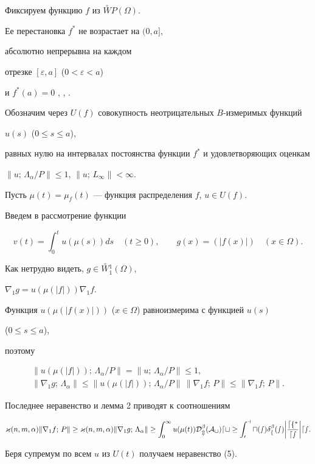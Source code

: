 \begin{pf} Фиксируем функцию $f$ из $\overset{\circ}{W}P(\Omega)$. 


Ее перестановка $f^*$ не возрастает на $(0,a]$, 


абсолютно непрерывна на каждом 


отрезке $[\varepsilon,a]$ ($0<\varepsilon<a$) 


и $f^*(a)=0$ \cite{Kol}, \cite{Kli1}, \cite{Kli2}. 


Обозначим через $U(f)$ совокупность неотрицательных $B$-измеримых функций 


$u(s)$ ($0\le s\le a$), 


равных нулю на интервалах постоянства функции $f^*$ и удовлетворяющих оценкам 


$\|u;\,\Lambda_\alpha/P\|\le 1$, $\|u;\,L_\infty\|<\infty$. 


 


Пусть $\mu(t)=\mu_f(t)$ --- функция распределения $f$, $u\in U(f)$. 


Введем в рассмотрение функции 


$$ 


v(t)=\int_0^t u(\mu(s))ds\quad (t\ge 0),\qquad 


g(x)=(|f(x)|) \quad (x\in\Omega). 


$$ 


Как нетрудно видеть, $g\in\overset{\circ}{W}{}_1^1(\Omega)$, 


$\nabla_1g=u(\mu(|f|))\nabla_1f$. 


Функция $u(\mu(|f(x)|))$ ($x\in\Omega$) равноизмерима с функцией $u(s)$ 


($0\le s\le a$), 


поэтому 


\begin{gather*} 


\|u(\mu(|f|));\,\Lambda_\alpha/P\|=\|u;\,\Lambda_\alpha/P\| \le 1, \\ 


\|\nabla_1g;\,\Lambda_\alpha\| \le 


\bigl\|u(\mu(|f|));\,\Lambda_\alpha/P\bigr\|\,\|\nabla_1f;\,P\| 


\le \|\nabla_1f;\, P\|. 


\end{gather*} 


 


Последнее неравенство и лемма 2 приводят к соотношениям 


$$ 


\varkappa(n,m,\alpha)\|\nabla_1f;\,P\|\ge 


\varkappa(n,m,\alpha)\|\nabla_1g;\,\Lambda_\alpha\| \ge 


\int_0^\infty u(\mu(t))\cal D_m^\beta(A_t)dt \ge 


\int_0^a u(s)\delta_f^\beta(s)\biggl|\frac{df^*}{ds}\biggr| ds. 


$$ 


Беря супремум по всем $u$ из $U(t)$ получаем неравенство (5). 


\end{pf} 


